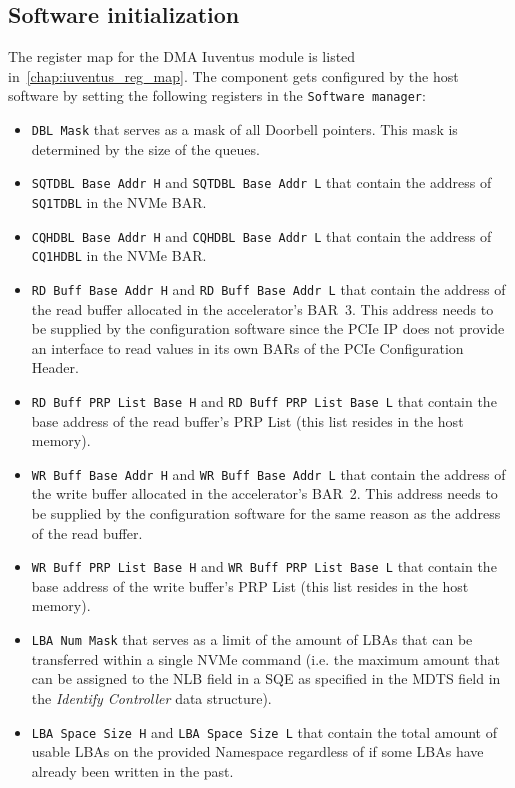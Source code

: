 \subsection{Software initialization}

The register map for the DMA Iuventus module is listed in~\cref{chap:iuventus_reg_map}. The
component gets configured by the host software by setting the following registers in the
\verb|Software manager|:

\begin{itemize}
    \item \verb|DBL Mask| that serves as a mask of all Doorbell pointers. This mask is determined by
    the size of the queues.
    \item \verb|SQTDBL Base Addr H| and \verb|SQTDBL Base Addr L| that contain the address of
    \verb|SQ1TDBL| in the NVMe BAR.
    \item \verb|CQHDBL Base Addr H| and \verb|CQHDBL Base Addr L| that contain the address of
    \verb|CQ1HDBL| in the NVMe BAR.
    \item \verb|RD Buff Base Addr H| and \verb|RD Buff Base Addr L| that contain the address of the
    read buffer allocated in the accelerator's BAR~3. This address needs to be supplied by the
    configuration software since the PCIe IP does not provide an interface to read values in its own
    BARs of the PCIe Configuration Header.
    \item \verb|RD Buff PRP List Base H| and \verb|RD Buff PRP List Base L| that contain the base
    address of the read buffer's PRP List (this list resides in the host memory).
    \item \verb|WR Buff Base Addr H| and \verb|WR Buff Base Addr L| that contain the address of the
    write buffer allocated in the accelerator's BAR~2. This address needs to be supplied by the
    configuration software for the same reason as the address of the read buffer.
    \item \verb|WR Buff PRP List Base H| and \verb|WR Buff PRP List Base L| that contain the base
    address of the write buffer's PRP List (this list resides in the host memory).
    \item \verb|LBA Num Mask| that serves as a limit of the amount of LBAs that can be transferred
    within a single NVMe command (i.e. the maximum amount that can be assigned to the \ac{NLB}
    field in a \ac{SQE} as specified in the \ac{MDTS} field in the \emph{Identify Controller} data
    structure).
    \item \verb|LBA Space Size H| and \verb|LBA Space Size L| that contain the total amount of
    usable LBAs on the provided Namespace regardless of if some \acp{LBA} have already been written
    in the past.
\end{itemize}

